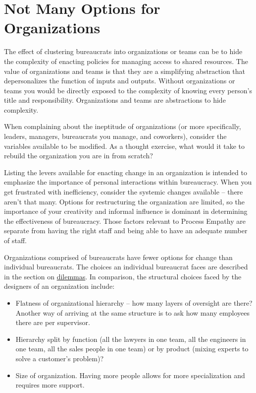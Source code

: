 \section{Not Many Options for Organizations}

The effect of clustering bureaucrats into organizations or teams can be to hide the complexity of enacting policies for managing access to shared resources. The value of organizations and teams is that they are a simplifying abstraction that depersonalizes the function of inputs and outputs. Without organizations or teams you would be directly exposed to the complexity of knowing every person's title and responsibility. Organizations and teams are abstractions to hide complexity.

When complaining about the ineptitude of organizations (or more specifically, leaders, managers, bureaucrats you manage, and coworkers), consider the variables available to be modified. As a thought exercise, what would it take to rebuild the organization you are in from scratch? 

Listing the levers available for enacting change in an organization is intended to emphasize the importance of personal interactions within bureaucracy. When you get frustrated with inefficiency, consider the systemic changes available -- there aren't that many. Options for restructuring the organization are limited, so the importance of your creativity and informal influence is dominant in determining the effectiveness of bureaucracy. Those factors relevant to Process Empathy are separate from having the right staff and being able to have an adequate number of staff. 

Organizations comprised of bureaucrats have fewer options for change than individual bureaucrats. The choices an individual bureaucrat faces are described\iftoggle{haspagenumbers}{on page~\pageref{sec:dilemma-trilemma}}{}
in the section on \hyperref[sec:dilemma-trilemma]{dilemmas}.
In comparison, the structural choices faced by the designers of an organization include:
\begin{itemize}
    \item Flatness of organizational hierarchy -- how many layers of oversight are there? Another way of arriving at the same structure is to ask how many employees there are per supervisor.
    \item Hierarchy split by function (all the lawyers in one team, all the engineers in one team, all the sales people in one team) or by product (mixing experts to solve a customer's problem)?

    
    \item Size of organization. Having more people allows for more specialization and requires more support. 
\end{itemize}

